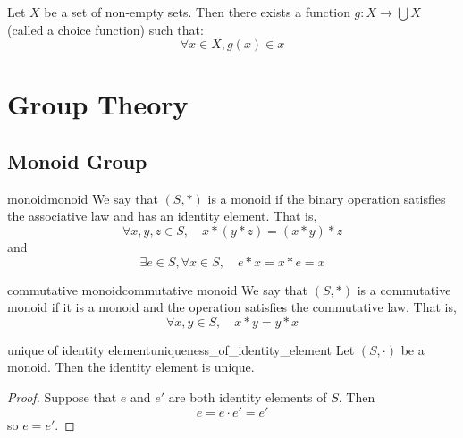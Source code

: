 \documentclass[11pt,lang=en]{elegantbook}
\begin{document}
\begin{axiom}
  Let $X$ be a set of non-empty sets. Then there exists a function $g : X \to \bigcup X$ (called a choice function) such that:
  \[
    \forall x \in X, g(x) \in x
  \]
\end{axiom}





\chapter{Group Theory}


\section{Monoid Group}

\begin{definition}{monoid}{monoid}
  We say that $(S, \ast)$ is a monoid if the binary operation satisfies the associative law and has an identity element. That is,
  \[
  \forall x, y, z \in S, \quad x \ast (y \ast z) = (x \ast y) \ast z
  \]
  and
  \[
  \exists e \in S, \forall x \in S, \quad e \ast x = x \ast e = x
  \]
\end{definition}


\begin{definition}{commutative monoid}{commutative monoid}
  We say that $(S, \ast)$ is a commutative monoid if it is a monoid and the operation satisfies the commutative law. That is,
  \[
  \forall x, y \in S, \quad x \ast y = y \ast x
  \]
\end{definition}

\begin{proposition}{unique of identity element}{uniqueness_of_identity_element}
  Let $(S, \cdot)$ be a monoid. Then the identity element is unique.
\end{proposition}
\begin{proof}
  Suppose that $e$ and $e'$ are both identity elements of $S$. Then
  \[
  e = e \cdot e' = e'
  \]
  so $e = e'$.
\end{proof}
\end{document}
